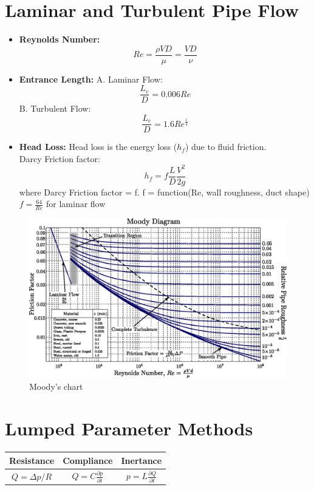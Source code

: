 \documentclass{article}
\begin{document}
\section{Laminar and Turbulent Pipe Flow}
\begin{itemize}
\item \textbf{Reynolds Number:}
    \[ Re = \frac{\rho VD}{\mu} = \frac{VD}{\nu}\]
    
\item \textbf{Entrance Length:}
    A. Laminar Flow: \[ \frac{L_{e}}{D} = 0.006 Re \]
    B. Turbulent Flow: \[ \frac{L_{e}}{D} = 1.6 Re^{\frac{1}{4}} \]
    
\item \textbf{Head Loss:}
Head loss is the energy loss ($h_{f}$) due to fluid friction.\\
Darcy Friction factor:
\[ h_{f} = f\frac{L}{D}\frac{V^{2}}{2g}\]
where Darcy Friction factor = f. f = function(Re, wall roughness, duct shape)\\
$ f = \frac{64}{Re}$ for laminar flow
\end{itemize}

\begin{landscape}
\begin{figure}
    \centering
    \includegraphics{img/Moody_EN.eps}
    \caption{Moody's chart}
    \label{fig:moody}
\end{figure}
\end{landscape}






\section{Lumped Parameter Methods}
\begin{table}[H]
    \centering
    \begin{tabular}{|c|c|c|} \hline 
        Resistance & Compliance & Inertance  \\ [.2em]\hline 
        $Q = \Delta p / R$ & $Q = C \frac{\partial p}{\partial t}$ & $p = L \frac{\partial Q}{\partial t}$ \\ [.2em] \hline
    \end{tabular}
\end{table}
\end{document}
